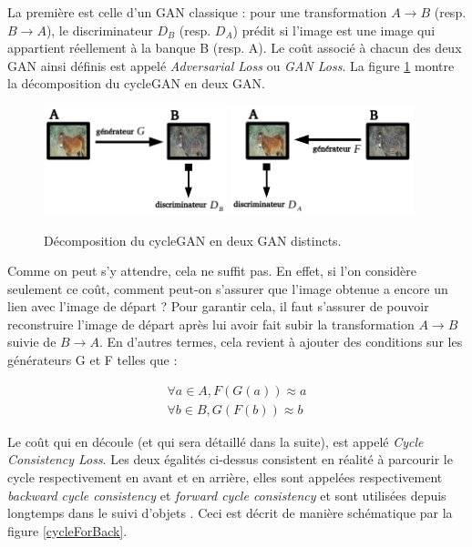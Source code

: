 La première est celle d'un GAN classique : pour une transformation $ A \rightarrow B $ (resp. $ B \rightarrow A $), le discriminateur $ D_B $ (resp. $ D_A $) prédit si l'image est une image qui appartient réellement à la banque B (resp. A). Le coût associé à chacun des deux GAN ainsi définis est appelé \textit{Adversarial Loss} ou \textit{GAN Loss}. La figure \ref{cycle_ganGF} montre la décomposition du cycleGAN en deux GAN. \\

\begin{figure}[!h]
\centering
\includegraphics[width=150pt]{"images/cycle/cycle_ganG"}
\hspace*{10mm}
\includegraphics[width=150pt]{"images/cycle/cycle_ganF"}
\caption{Décomposition du cycleGAN en deux GAN distincts.}
\label{cycle_ganGF}
\end{figure}

Comme on peut s'y attendre, cela ne suffit pas. En effet, si l'on considère seulement ce coût, comment peut-on s'assurer que l'image obtenue a encore un lien avec l'image de départ ? Pour garantir cela, il faut s'assurer de pouvoir reconstruire l'image de départ après lui avoir fait subir  la transformation $ A \rightarrow B $ suivie de $ B \rightarrow A $. En d'autres termes, cela revient à ajouter des conditions sur les générateurs G et F telles que :

\begin{equation}
\begin{split}
\forall a \in A, F(G(a)) \approx a \\
\forall b \in B, G(F(b)) \approx b
\end{split}
\end{equation}

Le coût qui en découle (et qui sera détaillé dans la suite), est appelé \textit{Cycle Consistency Loss}. Les deux égalités ci-dessus consistent en réalité à parcourir le cycle respectivement en avant et en arrière, elles sont appelées respectivement \textit{backward cycle consistency} et \textit{forward cycle consistency} et sont utilisées depuis longtemps dans le suivi d'objets \cite{kalal_forward-backward_2010}. Ceci est décrit de manière schématique par la figure \ref{cycleForBack}.\\

